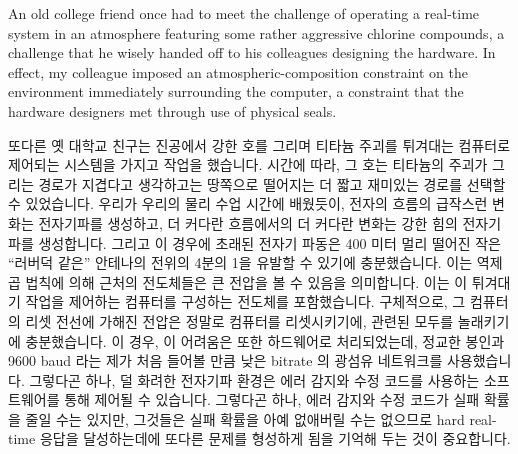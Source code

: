 An old college friend once had to meet the challenge of operating
a real-time system in an atmosphere featuring some rather aggressive
chlorine compounds, a challenge that he wisely handed off to his
colleagues designing the hardware.
In effect, my colleague imposed an atmospheric-composition constraint
on the environment immediately surrounding the computer, a constraint
that the hardware designers met through use of physical seals.
\fi

또다른 옛 대학교 친구는 진공에서 강한 호를 그리며 티타늄 주괴를 튀겨대는
컴퓨터로 제어되는 시스템을 가지고 작업을 했습니다.
시간에 따라, 그 호는 티타늄의 주괴가 그리는 경로가 지겹다고 생각하고는 땅쪽으로
떨어지는 더 짧고 재미있는 경로를 선택할 수 있었습니다.
우리가 우리의 물리 수업 시간에 배웠듯이, 전자의 흐름의 급작스런 변화는
전자기파를 생성하고, 더 커다란 흐름에서의 더 커다란 변화는 강한 힘의 전자기파를
생성합니다.
그리고 이 경우에 초래된 전자기 파동은 400 미터 멀리 떨어진 작은 ``러버덕 같은''
안테나의 전위의 4분의 1을 유발할 수 있기에 충분했습니다.
이는 역제곱 법칙에 의해 근처의 전도체들은 큰 전압을 볼 수 있음을 의미합니다.
이는 이 튀겨대기 작업을 제어하는 컴퓨터를 구성하는 전도체를 포함했습니다.
구체적으로, 그 컴퓨터의 리셋 전선에 가해진 전압은 정말로 컴퓨터를 리셋시키기에,
관련된 모두를 놀래키기에 충분했습니다.
이 경우, 이 어려움은 또한 하드웨어로 처리되었는데, 정교한 봉인과 9600 baud 라는
제가 처음 들어볼 만큼 낮은 bitrate 의 광섬유 네트워크를 사용했습니다.
그렇다곤 하나, 덜 화려한 전자기파 환경은 에러 감지와 수정 코드를 사용하는
소프트웨어를 통해 제어될 수 있습니다.
그렇다곤 하나, 에러 감지와 수정 코드가 실패 확률을 줄일 수는 있지만, 그것들은
실패 확률을 아예 없애버릴 수는 없으므로 hard real-time 응답을 달성하는데에
또다른 문제를 형성하게 됨을 기억해 두는 것이 중요합니다.
\iffalse


